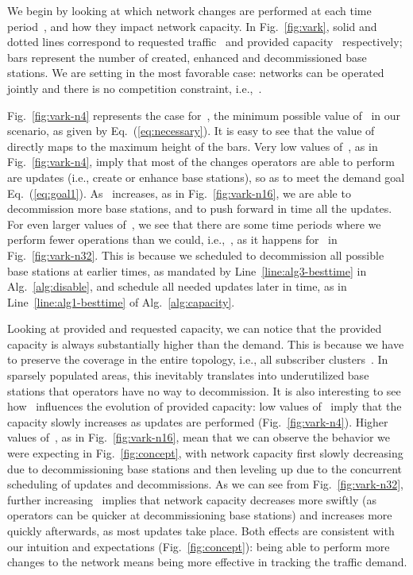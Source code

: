 \documentclass[10pt,journal,cspaper,compsoc]{IEEEtran}
\newcommand{\Fig}[1]{Fig.~\ref{fig:#1}}
\newcommand{\Eq}[1]{Eq.~(\ref{eq:#1})}
\newcommand{\Alg}[1]{Alg.~\ref{alg:#1}}
\newcommand{\Line}[1]{Line~\ref{line:#1}}
\begin{document}
We begin by looking at which network changes are performed at each time period~, and how they impact network capacity.
In \Fig{vark}, solid and dotted lines correspond to requested traffic~ and provided capacity~ respectively;
bars represent the number of
created, enhanced and decommissioned base stations.
We are setting in the most favorable case: networks can be operated jointly and there is no competition constraint, i.e.,~.

\Fig{vark-n4} represents the case for~, the minimum possible value of~ in our scenario, as given by \Eq{necessary}.
It is easy to see that the value of~ directly maps to the maximum height of the bars.
Very low values of~, as in \Fig{vark-n4}, imply that most of the changes operators are
able to perform are updates (i.e., create or enhance base stations), so as to meet the demand goal \Eq{goal1}.
As~ increases, as in \Fig{vark-n16}, we are able to decommission more base stations,
and to push forward in time all the updates.
For even larger values of~, we see that there are some time periods where we perform fewer
operations than we could, i.e.,~,
as it happens for~ in \Fig{vark-n32}.
This is because we scheduled to decommission all possible base stations at earlier times,
as mandated by \Line{alg3-besttime} in \Alg{disable},
and schedule all needed updates later in time, as in \Line{alg1-besttime} of \Alg{capacity}.

Looking at provided and requested capacity, we can notice that the provided capacity is always substantially higher
than the demand.
This is because we have to preserve the coverage
in the entire topology, i.e., all subscriber clusters~.
In sparsely populated areas, this inevitably translates into underutilized base stations
that operators have no way to decommission.
It is also interesting to see how~ influences the evolution of provided capacity:
low values of~ imply that the capacity slowly increases as updates are performed
(\Fig{vark-n4}).
Higher values of~, as in \Fig{vark-n16}, mean that we can observe the behavior we were
expecting in \Fig{concept}, with network capacity first slowly decreasing due to decommissioning base
stations and then leveling up due to the concurrent scheduling of updates and decommissions.
As we can see from \Fig{vark-n32}, further increasing~ implies that network capacity decreases
more swiftly (as operators can be quicker at decommissioning base stations) and increases more quickly
afterwards, as most updates take place.
Both effects are consistent with our intuition and expectations (\Fig{concept}): being able to perform more changes to the network means being more effective in tracking the traffic demand.
\end{document}
